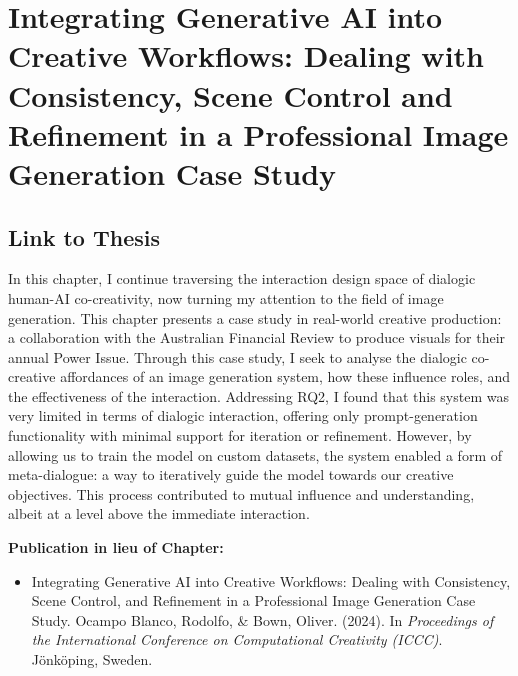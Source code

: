 \chapter{Integrating Generative AI into Creative Workflows: Dealing with Consistency, Scene Control and Refinement in a Professional Image Generation Case Study} \label{c:tc6} 

\section{Link to Thesis}
In this chapter, I continue traversing the interaction design space of dialogic human-AI co-creativity, now turning my attention to the field of image generation. This chapter presents a case study in real-world creative production: a collaboration with the Australian Financial Review to produce visuals for their annual Power Issue.
Through this case study, I seek to analyse the dialogic co-creative affordances of an image generation system, how these influence roles, and the effectiveness of the interaction. Addressing RQ2, I found that this system was very limited in terms of dialogic interaction, offering only prompt-generation functionality with minimal support for iteration or refinement. However, by allowing us to train the model on custom datasets, the system enabled a form of meta-dialogue: a way to iteratively guide the model towards our creative objectives. This process contributed to mutual influence and understanding, albeit at a level above the immediate interaction.

\textbf{Publication in lieu of Chapter:}


\begin{itemize}
    \item Integrating Generative AI into Creative Workflows: Dealing with Consistency, Scene Control, and Refinement in a Professional Image Generation Case Study. Ocampo Blanco, Rodolfo, \& Bown, Oliver. (2024). In \textit{Proceedings of the International Conference on Computational Creativity (ICCC)}. Jönköping, Sweden.
\end{itemize}



